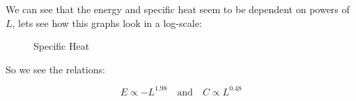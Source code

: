 \documentclass[a4paper]{article}
\begin{document}
We can see that the energy and specific heat seem to be dependent on powers of $L$, lets see how this graphs look in a log-scale:

\begin{figure}[H]
\centering

\begin{minipage}{0.48\textwidth}
    \centering
    \resizebox{0.95\textwidth}{!}{
    
    }
    \caption{Absolute Energy}
\end{minipage}
\hfill
\begin{minipage}{0.48\textwidth}
    \centering
    \resizebox{0.95\textwidth}{!}{
    
    }
    \caption{Specific Heat}
\end{minipage}

\end{figure}

So we see the relations:

\[
E \propto -L^{1.98} \quad \text{and} \quad C \propto L^{0.48}
\]
\end{document}
